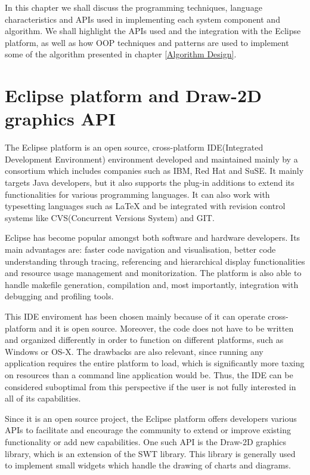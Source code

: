 In this chapter we shall discuss the programming techniques, language characteristics and APIs
used in implementing each system component and algorithm. We shall highlight the APIs used and the 
integration with the Eclipse platform, as well as how OOP techniques and patterns are used to implement 
some of the algorithm presented in chapter \ref{Algorithm Design}.

\section{Eclipse platform and Draw-2D graphics API}

The Eclipse platform is an open source, cross-platform IDE(Integrated Development Environment) environment 
developed and maintained mainly by a consortium which includes companies such as IBM, Red Hat and SuSE. 
It mainly targets Java developers, but it also supports the plug-in additions to extend its functionalities 
for various programming languages. It can also work with typesetting languages such as LaTeX and be integrated 
with revision control systems like CVS(Concurrent Versions System) and GIT.

Eclipse has become popular amongst both software and hardware developers. Its main advantages are: faster 
code navigation and visualisation, better code understanding through tracing, referencing and hierarchical 
display functionalities and resource usage management and monitorization. The platform is also able to 
handle makefile generation, compilation and, most importantly, integration with debugging and profiling tools.

This IDE enviroment has been chosen mainly because of it can operate cross-platform and it is open source. 
Moreover, the code does not have to be written and organized differently in order to function on different 
platforms, such as Windows or OS-X. The drawbacks are also relevant, since running any application requires 
the entire platform to load, which is significantly more taxing on resources than a command line application 
would be. Thus, the IDE can be considered suboptimal from this perspective if the user is not fully interested 
in all of its capabilities.

Since it is an open source project, the Eclipse platform offers developers various APIs to facilitate and 
encourage the community to extend or improve existing functionality or add new capabilities. One such 
API is the Draw-2D graphics library, which is an extension of the SWT library. This library is generally used 
to implement small widgets which handle the drawing of charts and diagrams.

